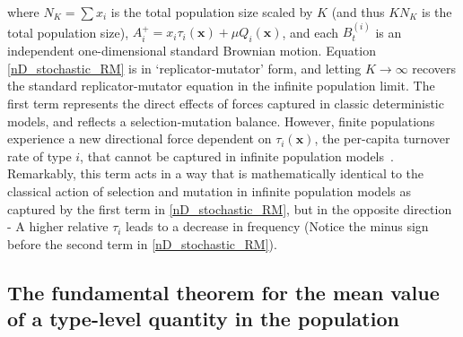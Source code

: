 where $N_K = \sum x_i$ is the total population size scaled by $K$ (and thus $KN_K$ is the total population size), $A_i^{+} = x_i\tau_i(\mathbf{x}) + \mu Q_i(\mathbf{x})$, and each $B^{(i)}_t$ is an independent one-dimensional standard Brownian motion. Equation \eqref{nD_stochastic_RM} is in `replicator-mutator' form, and letting $K \to \infty$ recovers the standard replicator-mutator equation in the infinite population limit. The first term represents the direct effects of forces captured in classic deterministic models, and reflects a selection-mutation balance. However, finite populations experience a new directional force dependent on $\tau_i(\mathbf{x})$, the per-capita turnover rate of type $i$, that cannot be captured in infinite population models~\citep{kuosmanen_turnover_2022}. Remarkably, this term acts in a way that is mathematically identical to the classical action of selection and mutation in infinite population models as captured by the first term in \eqref{nD_stochastic_RM}, but in the opposite direction - A higher relative $\tau_i$ leads to a decrease in frequency (Notice the minus sign before the second term in \eqref{nD_stochastic_RM}).
\subsection{The fundamental theorem for the mean value of a type-level quantity in the population}\label{sec_fun_theorems_mean}

